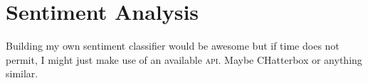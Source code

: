 \chapter{Sentiment Analysis}
\label{cha:sentiment_analysis}

Building my own sentiment classifier would be awesome but if time does not permit, I might just make
use of an available \textsc{api}. Maybe CHatterbox or anything similar.

